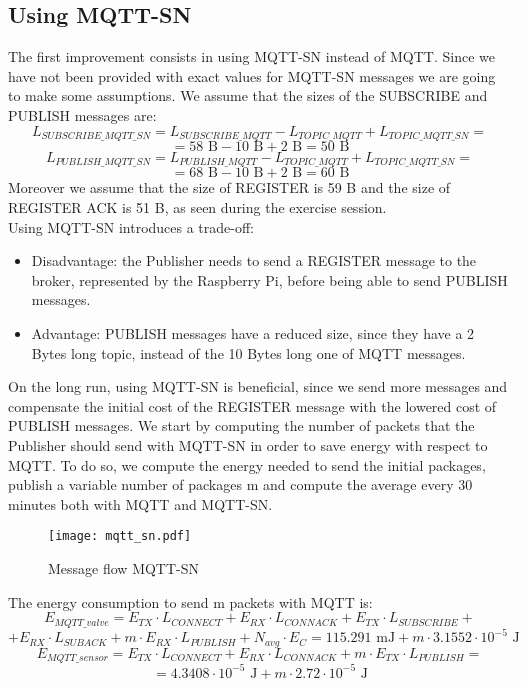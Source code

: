 \subsection{Using MQTT-SN}
The first improvement consists in using MQTT-SN instead of MQTT. Since we have not been provided with exact values for MQTT-SN messages we are going to make some assumptions. We assume that the sizes of the SUBSCRIBE and PUBLISH messages are:
\[L_{SUBSCRIBE\_MQTT\_SN} = L_{SUBSCRIBE\_MQTT} - L_{TOPIC\_MQTT} + L_{TOPIC\_MQTT\_SN}  =\]
\[= 58 \text{ B} - 10 \text{ B} + 2 \text{ B} = 50 \text{ B} \]
\[L_{PUBLISH\_MQTT\_SN} = L_{PUBLISH\_MQTT} - L_{TOPIC\_MQTT} + L_{TOPIC\_MQTT\_SN}  =\]
\[= 68 \text{ B} - 10 \text{ B} + 2 \text{ B} = 60 \text{ B} \]
Moreover we assume that the size of REGISTER is 59 B and the size of REGISTER ACK is 51 B, as seen during the exercise session.\\
Using MQTT-SN introduces a trade-off: 
\begin{itemize}
	\item Disadvantage: the Publisher needs to send a REGISTER message to the broker, represented by the Raspberry Pi, before being able to send PUBLISH messages.
	\item Advantage: PUBLISH messages have a reduced size, since they have a 2 Bytes long topic, instead of the 10 Bytes long one of MQTT messages.
\end{itemize}
On the long run, using MQTT-SN is beneficial, since we send more messages and compensate the initial cost of the REGISTER message with the lowered cost of PUBLISH messages. We start by computing the number of packets that the Publisher should send with MQTT-SN in order to save energy with respect to MQTT. To do so, we compute the energy needed to send the initial packages, publish a variable number of packages m and compute the average every 30 minutes both with MQTT and MQTT-SN.\\
\begin{figure}[H]
    \centering
    \texttt{[image: mqtt\_sn.pdf]}
    \caption{Message flow MQTT-SN}
\end{figure}
The energy consumption to send m packets with MQTT is:
\[E_{MQTT\_valve} = E_{TX} \cdot L_{CONNECT} + E_{RX} \cdot L_{CONNACK} + E_{TX} \cdot L_{SUBSCRIBE} +\]
\[+ E_{RX} \cdot L_{SUBACK} + m \cdot E_{RX} \cdot L_{PUBLISH} + N_{avg} \cdot E_{C} = 115.291 \text{ mJ} + m \cdot 3.1552 \cdot 10^{-5} \text{ J}\]
\[E_{MQTT\_sensor} = E_{TX} \cdot L_{CONNECT} + E_{RX} \cdot L_{CONNACK} + m \cdot E_{TX} \cdot L_{PUBLISH} =\]
\[= 4.3408 \cdot 10^{-5} \text{ J} + m \cdot 2.72 \cdot 10^{-5} \text{ J}\]

